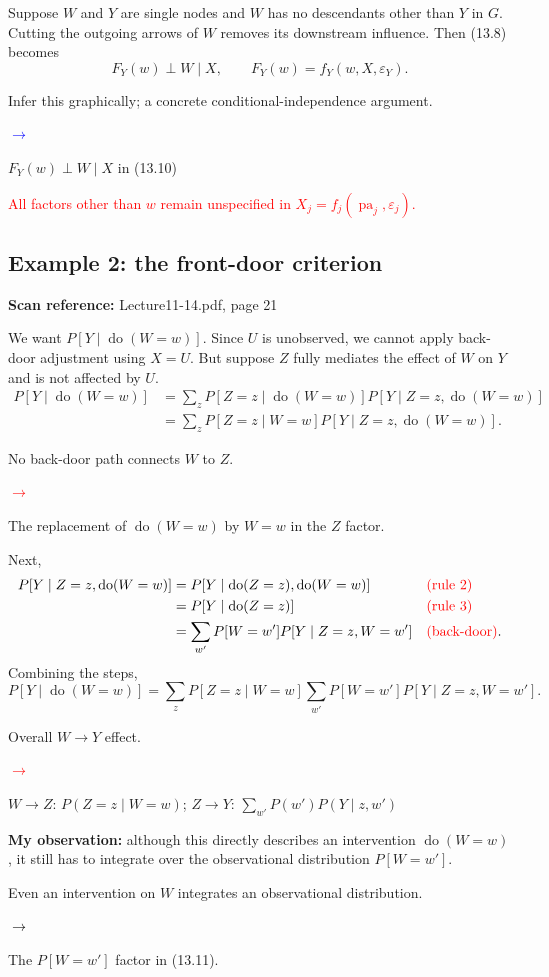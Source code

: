 \documentclass[11pt,a4paper]{article}
\newcommand{\sourcepages}[1]{\par{\small\sffamily\color{muted}\textbf{Scan reference:} #1\par}\nobreak\smallskip\nopagebreak[4]}
\newcommand{\inkred}[1]{\textcolor{red}{#1}}
\newcommand{\notearrow}[3]{%
\par\Needspace{6\baselineskip}\smallskip
\noindent\begin{minipage}[c]{0.43\linewidth}\raggedright\color{#1}#2\end{minipage}%
\hfill\textcolor{#1}{\(\longrightarrow\)}\hfill%
\begin{minipage}[c]{0.43\linewidth}\raggedright#3\end{minipage}\par\smallskip}
\begin{document}
Suppose $W$ and $Y$ are single nodes and $W$ has no descendants other than $Y$ in $G$. Cutting the outgoing arrows of $W$ removes its downstream influence. Then (13.8) becomes
\[
 F_Y(w)\perp W\mid X,\qquad
 F_Y(w)=f_Y(w,X,\varepsilon_Y).\tag{13.10}
\]
\notearrow{blue}{Infer this graphically; a concrete conditional-independence argument.}{$F_Y(w)\perp W\mid X$ in (13.10)}
\inkred{All factors other than $w$ remain unspecified in $X_j=f_j(\operatorname{pa}_j,\varepsilon_j)$.}

\subsection{Example 2: the front-door criterion}
\sourcepages{Lecture11-14.pdf, page 21}
\begin{center}
\end{center}
We want $P[Y\mid\operatorname{do}(W=w)]$. Since $U$ is unobserved, we cannot apply back-door adjustment using $X=U$. But suppose $Z$ fully mediates the effect of $W$ on $Y$ and is not affected by $U$.
\begin{align*}
 P[Y\mid\operatorname{do}(W=w)]
 &=\sum_zP[Z=z\mid\operatorname{do}(W=w)]
 P[Y\mid Z=z,\operatorname{do}(W=w)]\\
 &=\sum_zP[Z=z\mid W=w]
 P[Y\mid Z=z,\operatorname{do}(W=w)].
\end{align*}
\notearrow{red}{No back-door path connects $W$ to $Z$.}{The replacement of $\operatorname{do}(W=w)$ by $W=w$ in the $Z$ factor.} Next,
\begin{align*}
 P[Y\mid Z=z,\operatorname{do}(W=w)]
 &=P[Y\mid\operatorname{do}(Z=z),\operatorname{do}(W=w)]
 &&\text{\inkred{(rule 2)}}\\
 &=P[Y\mid\operatorname{do}(Z=z)]&&\text{\inkred{(rule 3)}}\\
 &=\sum_{w'}P[W=w']P[Y\mid Z=z,W=w']&&\text{\inkred{(back-door)}}.
\end{align*}
Combining the steps,
\[
 P[Y\mid\operatorname{do}(W=w)]
 =\sum_zP[Z=z\mid W=w]
 \sum_{w'}P[W=w']P[Y\mid Z=z,W=w'].\tag{13.11}
\]
\notearrow{red}{Overall $W\to Y$ effect.}{$W\to Z$: $P(Z=z\mid W=w)$; $Z\to Y$: $\sum_{w\prime}P(w\prime)P(Y\mid z,w\prime)$}
\textbf{My observation:} although this directly describes an intervention $\operatorname{do}(W=w)$, it still has to integrate over the observational distribution $P[W=w']$.
\notearrow{black}{Even an intervention on $W$ integrates an observational distribution.}{The $P[W=w']$ factor in (13.11).}
\end{document}
